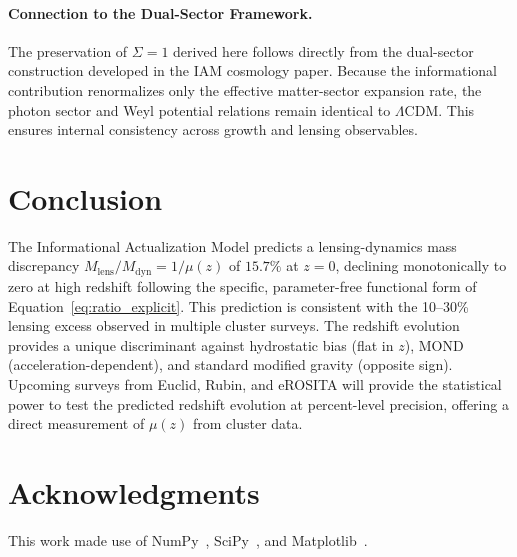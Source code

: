 \documentclass[12pt,a4paper]{article}
\begin{document}

\paragraph{Connection to the Dual-Sector Framework.}
The preservation of $\Sigma = 1$ derived here follows directly from the
dual-sector construction developed in the IAM cosmology paper.
Because the informational contribution renormalizes only the effective
matter-sector expansion rate, the photon sector and Weyl potential
relations remain identical to $\Lambda$CDM. This ensures internal
consistency across growth and lensing observables.

\section{Conclusion}

The Informational Actualization Model predicts a lensing-dynamics mass discrepancy
$M_\mathrm{lens}/M_\mathrm{dyn} = 1/\mu(z)$ of $15.7\%$ at $z = 0$, declining
monotonically to zero at high redshift following the specific, parameter-free
functional form of Equation~\ref{eq:ratio_explicit}. This prediction is consistent
with the 10--30\% lensing excess observed in multiple cluster surveys. The
redshift evolution provides a unique discriminant against hydrostatic bias
(flat in $z$), MOND (acceleration-dependent), and standard modified gravity
(opposite sign). Upcoming surveys from Euclid, Rubin, and eROSITA will provide
the statistical power to test the predicted redshift evolution at percent-level
precision, offering a direct measurement of $\mu(z)$ from cluster data.

\section*{Acknowledgments}

This work made use of NumPy~\citep{Harris2020}, SciPy~\citep{Virtanen2020},
and Matplotlib~\citep{Hunter2007}.
\end{document}
